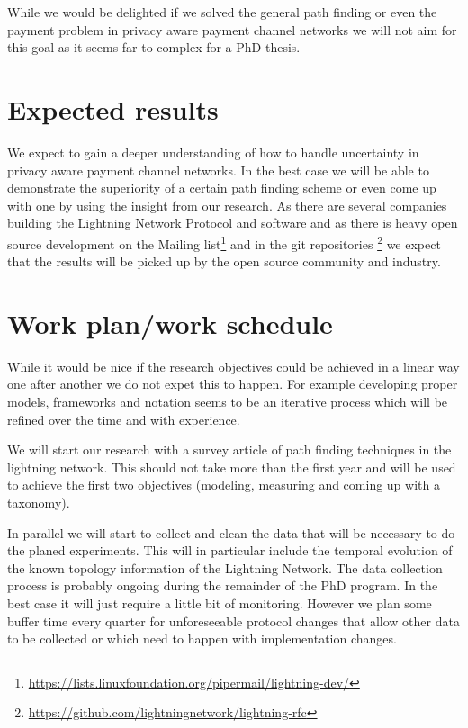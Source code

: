\documentclass[a4paper]{paper}
\begin{document}
While we would be delighted if we solved the general path finding or even the payment problem in privacy aware payment channel networks we will not aim for this goal as it seems far to complex for a PhD thesis.


\section{Expected results}
We expect to gain a deeper understanding of how to handle uncertainty in privacy aware payment channel networks.
In the best case we will be able to demonstrate the superiority of a certain path finding scheme or even come up with one by using the insight from our research.
As there are several companies building the Lightning Network Protocol and software and as there is heavy open source development on the Mailing list\footnote{\url{https://lists.linuxfoundation.org/pipermail/lightning-dev/}} and in the git repositories \footnote{\url{https://github.com/lightningnetwork/lightning-rfc}} we expect that the results will be picked up by the open source community and industry.

\section{Work plan/work schedule}



While it would be nice if the research objectives could be achieved in a linear way one after another we do not expet this to happen.
For example developing proper models, frameworks and notation seems to be an iterative process which will be refined over the time and with experience.

We will start our research with a survey article of path finding techniques in the lightning network.
This should not take more than the first year and will be used to achieve the first two objectives (modeling, measuring and coming up with a taxonomy).

In parallel we will start to collect and clean the data that will be necessary to do the planed experiments.
This will in particular include the temporal evolution of the known topology information of the Lightning Network.
The data collection process is probably ongoing during the remainder of the PhD program.
In the best case it will just require a little bit of monitoring.
However we plan some buffer time every quarter for unforeseeable protocol changes that allow other data to be collected or which need to happen with implementation changes.
\end{document}
